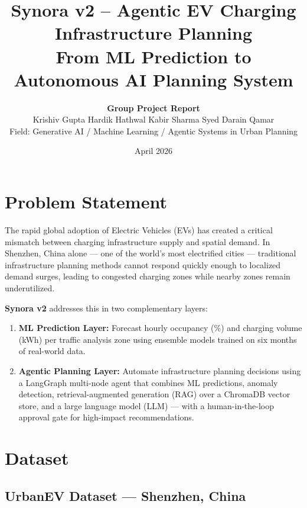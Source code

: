 \documentclass[12pt,a4paper]{article}
\title{%
  \textbf{Synora v2 – Agentic EV Charging Infrastructure Planning}\\[0.5em]
  \large From ML Prediction to Autonomous AI Planning System
}
\author{
  \textbf{Group Project Report} \\[0.3em]
  Krishiv Gupta \quad
  Hardik Hathwal \quad
  Kabir Sharma \quad
  Syed Darain Qamar \\[0.2em]
  \small Field: Generative AI / Machine Learning / Agentic Systems in Urban Planning
}
\date{April 2026}
\begin{document}
\maketitle
\onehalfspacing
\tableofcontents
\newpage

\section{Problem Statement}

The rapid global adoption of Electric Vehicles (EVs) has created a critical mismatch between
charging infrastructure supply and spatial demand. In Shenzhen, China alone — one of the
world's most electrified cities — traditional infrastructure planning methods cannot respond
quickly enough to localized demand surges, leading to congested charging zones while nearby
zones remain underutilized.

\medskip
\textbf{Synora v2} addresses this in two complementary layers:

\begin{enumerate}
  \item \textbf{ML Prediction Layer:} Forecast hourly occupancy (\%) and charging volume (kWh)
        per traffic analysis zone using ensemble models trained on six months of real-world data.

  \item \textbf{Agentic Planning Layer:} Automate infrastructure planning decisions using a
        LangGraph multi-node agent that combines ML predictions, anomaly detection,
        retrieval-augmented generation (RAG) over a ChromaDB vector store, and a
        large language model (LLM) — with a human-in-the-loop approval gate for
        high-impact recommendations.
\end{enumerate}

\section{Dataset}

\subsection*{UrbanEV Dataset — Shenzhen, China}
\end{document}

